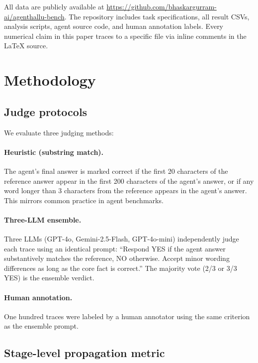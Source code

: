 \documentclass{article}
\begin{document}
All data are publicly available at
\url{https://github.com/bhaskargurram-ai/agenthallu-bench}.
The repository includes task specifications, all result CSVs, analysis
scripts, agent source code, and human annotation labels.
Every numerical claim in this paper traces to a specific file via
inline comments in the \LaTeX{} source.


\section{Methodology}
\label{sec:method}

\subsection{Judge protocols}

We evaluate three judging methods:

\paragraph{Heuristic (substring match).}
The agent's final answer is marked correct if the first 20 characters
of the reference answer appear in the first 200 characters of the
agent's answer, or if any word longer than 3 characters from the
reference appears in the agent's answer.
This mirrors common practice in agent benchmarks.

\paragraph{Three-LLM ensemble.}
Three LLMs (GPT-4o, Gemini-2.5-Flash, GPT-4o-mini) independently
judge each trace using an identical prompt: ``Respond YES if the agent
answer substantively matches the reference, NO otherwise.
Accept minor wording differences as long as the core fact is correct.''
The majority vote (2/3 or 3/3 YES) is the ensemble verdict.

\paragraph{Human annotation.}
One hundred traces were labeled by a human annotator using the same
criterion as the ensemble prompt.

\subsection{Stage-level propagation metric}
\label{sec:stagedef}
\end{document}

